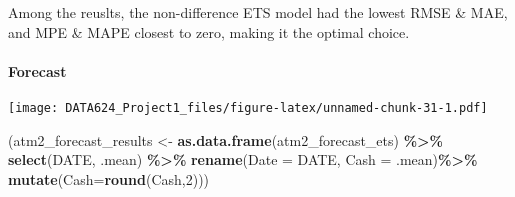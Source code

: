 \documentclass[
]{article}
\newenvironment{Shaded}{\begin{snugshade}}{\end{snugshade}}
\newcommand{\AttributeTok}[1]{\textcolor[rgb]{0.13,0.29,0.53}{#1}}
\newcommand{\CommentTok}[1]{\textcolor[rgb]{0.56,0.35,0.01}{\textit{#1}}}
\newcommand{\DecValTok}[1]{\textcolor[rgb]{0.00,0.00,0.81}{#1}}
\newcommand{\FunctionTok}[1]{\textcolor[rgb]{0.13,0.29,0.53}{\textbf{#1}}}
\newcommand{\NormalTok}[1]{#1}
\newcommand{\OtherTok}[1]{\textcolor[rgb]{0.56,0.35,0.01}{#1}}
\newcommand{\SpecialCharTok}[1]{\textcolor[rgb]{0.81,0.36,0.00}{\textbf{#1}}}
\newcommand{\StringTok}[1]{\textcolor[rgb]{0.31,0.60,0.02}{#1}}
\begin{document}
Among the reuslts, the non-difference ETS model had the lowest RMSE \&
MAE, and MPE \& MAPE closest to zero, making it the optimal choice.

\hypertarget{forecast-1}{%
\paragraph{Forecast}\label{forecast-1}}

\begin{Shaded}
\end{Shaded}

\texttt{[image: DATA624\_Project1\_files/figure-latex/unnamed-chunk-31-1.pdf]}

\begin{Shaded}
\begin{Highlighting}[]
\NormalTok{(atm2\_forecast\_results }\OtherTok{\textless{}{-}} 
  \FunctionTok{as.data.frame}\NormalTok{(atm2\_forecast\_ets) }\SpecialCharTok{\%\textgreater{}\%}
    \FunctionTok{select}\NormalTok{(DATE, .mean) }\SpecialCharTok{\%\textgreater{}\%} 
      \FunctionTok{rename}\NormalTok{(}\AttributeTok{Date =}\NormalTok{ DATE, }\AttributeTok{Cash =}\NormalTok{ .mean)}\SpecialCharTok{\%\textgreater{}\%}
        \FunctionTok{mutate}\NormalTok{(}\AttributeTok{Cash=}\FunctionTok{round}\NormalTok{(Cash,}\DecValTok{2}\NormalTok{)))}
\end{Highlighting}
\end{Shaded}
\end{document}
